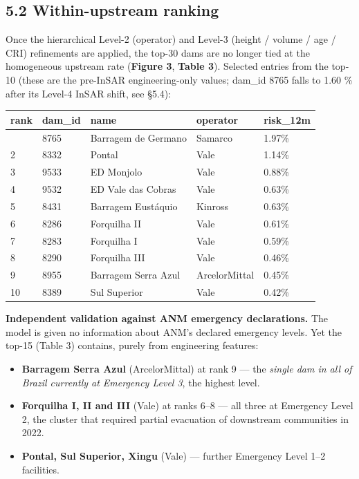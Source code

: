 \documentclass[
  11pt]{article}
\newcounter{none} %
\providecommand{\tightlist}{%
  \setlength{\itemsep}{0pt}\setlength{\parskip}{0pt}}
\begin{document}
\subsection{5.2 Within-upstream ranking}\label{within-upstream-ranking}

Once the hierarchical Level-2 (operator) and Level-3 (height / volume /
age / CRI) refinements are applied, the top-30 dams are no longer tied
at the homogeneous upstream rate (\textbf{Figure 3}, \textbf{Table 3}).
Selected entries from the top-10 (these are the pre-InSAR
engineering-only values; dam\_id 8765 falls to 1.60 \% after its Level-4
InSAR shift, see §5.4):

{\def\LTcaptype{none} %
\begin{longtable}[]{@{}lllll@{}}
\toprule\noalign{}
rank & dam\_id & name & operator & risk\_12m \\
\midrule\noalign{}
\endhead
\bottomrule\noalign{}
\endlastfoot
1 & 8765 & Barragem de Germano & Samarco & 1.97\% \\
2 & 8332 & Pontal & Vale & 1.14\% \\
3 & 9533 & ED Monjolo & Vale & 0.88\% \\
4 & 9532 & ED Vale das Cobras & Vale & 0.63\% \\
5 & 8431 & Barragem Eustáquio & Kinross & 0.63\% \\
6 & 8286 & Forquilha II & Vale & 0.61\% \\
7 & 8283 & Forquilha I & Vale & 0.59\% \\
8 & 8290 & Forquilha III & Vale & 0.46\% \\
9 & 8955 & Barragem Serra Azul & ArcelorMittal & 0.45\% \\
10 & 8389 & Sul Superior & Vale & 0.42\% \\
\end{longtable}
}

\textbf{Independent validation against ANM emergency declarations.} The
model is given no information about ANM's declared emergency levels. Yet
the top-15 (Table 3) contains, purely from engineering features:

\begin{itemize}
\tightlist
\item
  \textbf{Barragem Serra Azul} (ArcelorMittal) at rank 9 --- the
  \emph{single dam in all of Brazil currently at Emergency Level 3}, the
  highest level.
\item
  \textbf{Forquilha I, II and III} (Vale) at ranks 6--8 --- all three at
  Emergency Level 2, the cluster that required partial evacuation of
  downstream communities in 2022.
\item
  \textbf{Pontal, Sul Superior, Xingu} (Vale) --- further Emergency
  Level 1--2 facilities.
\end{itemize}
\end{document}
